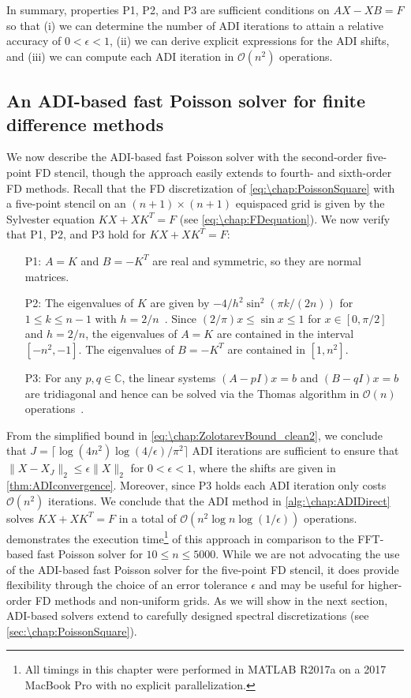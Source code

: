 In summary, properties P1, P2, and P3 are sufficient conditions on $AX-XB=F$ so that (i) we can determine the number of ADI iterations to attain a relative accuracy of $0<\epsilon<1$, (ii) we can derive explicit expressions for the ADI shifts, and (iii) we can compute each ADI iteration in $\mathcal{O}(n^2)$ operations.

\subsection{An ADI-based fast Poisson solver for finite difference methods}\label{sec:\chap:FDfastPoisson}
We now describe the ADI-based fast Poisson solver with the second-order five-point FD stencil, though the approach easily extends to fourth- and sixth-order FD methods. Recall that the FD discretization of \cref{eq:\chap:PoissonSquare} with a five-point stencil on an $(n+1)\times (n+1)$ equispaced grid is given by the Sylvester equation $KX+XK^T =F$ (see \cref{eq:\chap:FDequation}). We now verify that P1, P2, and P3 hold for $KX+XK^T = F$:
\vspace{1em}
\begin{enumerate}[itemsep=0.5em]
\item[P1:] $A = K$ and $B=-K^T$ are real and symmetric, so they are normal matrices.
\item[P2:] The eigenvalues of $K$ are given by $-4/h^2\sin^2(\pi k/(2n))$ for $1\leq k\leq n-1$ with $h = 2/n$~\cite[(2.23)]{LeVeque_07_01}. Since $(2/\pi)x\leq \sin x \leq 1$ for $x\in[0,\pi/2]$ and $h = 2/n$, the eigenvalues of $A=K$ are contained in the interval $[-n^2,-1]$. The eigenvalues of $B=-K^T$ are contained in $[1,n^2]$.
\item[P3:] For any $p,q\in\mathbb{C}$, the linear systems $(A-pI)x=b$ and $(B-qI)x=b$ are tridiagonal and hence can be solved via the Thomas algorithm in $\mathcal{O}(n)$ operations~\cite[p.~162]{Datta_10_01}.
\end{enumerate}
\vspace{1em}

From the simplified bound in \cref{eq:\chap:ZolotarevBound_clean2}, we conclude that $J = \lceil \log(4n^2)\log(4/\epsilon)/\pi^2\rceil$ ADI iterations are sufficient to ensure that $\|X-X_J\|_2\leq \epsilon \|X\|_2$ for $0<\epsilon<1$, where the shifts are given in \cref{thm:ADIconvergence}. Moreover, since P3 holds each ADI iteration only costs $\mathcal{O}(n^2)$ iterations.  We conclude that the ADI method in \cref{alg:\chap:ADIDirect} solves $KX+XK^T=F$ in a total of $\mathcal{O}(n^2\log n\log(1/\epsilon))$ operations.  demonstrates the execution time\footnote{All timings in this chapter were performed in MATLAB R2017a on a 2017 MacBook Pro with no explicit parallelization.} of this approach in comparison to the FFT-based fast Poisson solver for $10\leq n\leq 5000$.  While we are not advocating the use of the ADI-based fast Poisson solver for the five-point FD stencil, it does provide flexibility through the choice of an error tolerance $\epsilon$ and may be useful for higher-order FD methods and non-uniform grids. As we will show in the next section, ADI-based solvers extend to carefully designed spectral discretizations (see \cref{sec:\chap:PoissonSquare}).

